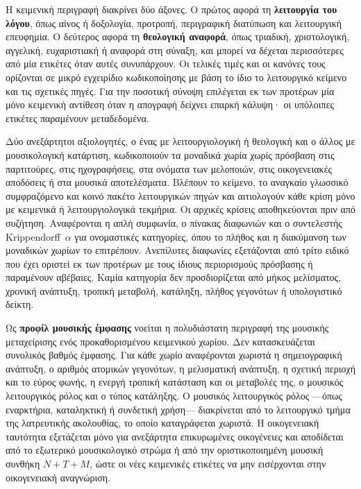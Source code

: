 \documentclass[11pt,a4paper]{article}
\begin{document}
Η κειμενική περιγραφή διακρίνει δύο άξονες. Ο πρώτος αφορά τη \textbf{λειτουργία του λόγου}, όπως αίνος ή δοξολογία, προτροπή, περιγραφική διατύπωση και λειτουργική επευφημία. Ο δεύτερος αφορά τη \textbf{θεολογική αναφορά}, όπως τριαδική, χριστολογική, αγγελική, ευχαριστιακή ή αναφορά στη σύναξη, και μπορεί να δέχεται περισσότερες από μία ετικέτες όταν αυτές συνυπάρχουν. Οι τελικές τιμές και οι κανόνες τους ορίζονται σε μικρό εγχειρίδιο κωδικοποίησης με βάση το ίδιο το λειτουργικό κείμενο και τις σχετικές πηγές. Για την ποσοτική σύνοψη επιλέγεται εκ των προτέρων μία μόνο κειμενική αντίθεση όταν η απογραφή δείχνει επαρκή κάλυψη· οι υπόλοιπες ετικέτες παραμένουν μεταδεδομένα.

Δύο ανεξάρτητοι αξιολογητές, ο ένας με λειτουργιολογική ή θεολογική και ο άλλος με μουσικολογική κατάρτιση, κωδικοποιούν τα μοναδικά χωρία χωρίς πρόσβαση στις παρτιτούρες, στις ηχογραφήσεις, στα ονόματα των μελοποιών, στις οικογενειακές αποδόσεις ή στα μουσικά αποτελέσματα. Βλέπουν το κείμενο, το αναγκαίο γλωσσικό συμφραζόμενο και κοινό πακέτο λειτουργικών πηγών και αιτιολογούν κάθε κρίση μόνο με κειμενικά ή λειτουργιολογικά τεκμήρια. Οι αρχικές κρίσεις αποθηκεύονται πριν από συζήτηση. Αναφέρονται η απλή συμφωνία, ο πίνακας διαφωνιών και ο συντελεστής Krippendorff~$\alpha$ για ονομαστικές κατηγορίες, όπου το πλήθος και η διακύμανση των μοναδικών χωρίων το επιτρέπουν. Ανεπίλυτες διαφωνίες εξετάζονται από τρίτο ειδικό που έχει οριστεί εκ των προτέρων με τους ίδιους περιορισμούς πρόσβασης ή παραμένουν αβέβαιες. Καμία κατηγορία δεν προσδιορίζεται από μήκος μελίσματος, χρονική ανάπτυξη, τροπική μεταβολή, κατάληξη, πλήθος γεγονότων ή υπολογιστικό δείκτη.

Ως \textbf{προφίλ μουσικής έμφασης} νοείται η πολυδιάστατη περιγραφή της μουσικής μεταχείρισης ενός προκαθορισμένου κειμενικού χωρίου. Δεν κατασκευάζεται συνολικός βαθμός έμφασης. Για κάθε χωρίο αναφέρονται χωριστά η σημειογραφική ανάπτυξη, ο αριθμός ατομικών γεγονότων, η μελισματική ανάπτυξη, η σχετική περιοχή και το εύρος φωνής, η ενεργή τροπική κατάσταση και οι μεταβολές της, ο μουσικός λειτουργικός ρόλος και ο τύπος κατάληξης. Ο μουσικός λειτουργικός ρόλος ---όπως εναρκτήρια, καταληκτική ή συνδετική χρήση--- διακρίνεται από το λειτουργικό τμήμα της λατρευτικής ακολουθίας, το οποίο καταγράφεται χωριστά. Η οικογενειακή ταυτότητα εξετάζεται μόνο για ανεξάρτητα επικυρωμένες οικογένειες και αποδίδεται από το εξωτερικό μουσικολογικό στρώμα ή από την οριστικοποιημένη μουσική συνθήκη $N{+}T{+}M$, ώστε οι νέες κειμενικές ετικέτες να μην εισέρχονται στην οικογενειακή αναγνώριση.
\end{document}
